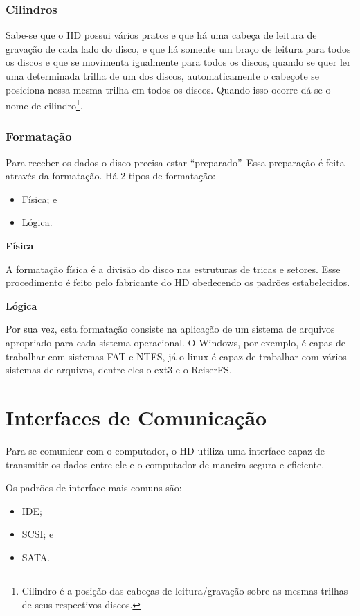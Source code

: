 \subsubsection{Cilindros}

Sabe-se que o HD possui vários pratos e que há uma cabeça de leitura de gravação de cada lado do disco, e que há somente um braço de leitura para todos os discos e que se movimenta igualmente para todos os discos, quando se quer ler uma determinada trilha de um dos discos, automaticamente o cabeçote se posiciona nessa mesma trilha em todos os discos. Quando isso ocorre dá-se o nome de cilindro\footnote{Cilindro é a posição das cabeças de leitura/gravação sobre as mesmas trilhas de seus respectivos discos.}.

\subsubsection{Formatação}

Para receber os dados o disco precisa estar ``preparado''. Essa preparação é feita através da formatação. Há 2 tipos de formatação:

\begin{itemize}
	\item Física; e
	\item Lógica.
\end{itemize}

\textbf{Física}

A formatação física é a divisão do disco nas estruturas de tricas e setores. Esse procedimento é feito pelo fabricante do HD obedecendo os padrões estabelecidos.

\textbf{Lógica}

Por sua vez, esta formatação consiste na aplicação de um sistema de arquivos apropriado para cada sistema operacional. O Windows, por exemplo, é capas de trabalhar com sistemas FAT e NTFS, já o linux é capaz de trabalhar com vários sistemas de arquivos, dentre eles o ext3 e o ReiserFS.

\section{Interfaces de Comunicação}

Para se comunicar com o computador, o HD utiliza uma interface capaz de transmitir os dados entre ele e o computador de maneira segura e eficiente.

Os padrões de interface mais comuns são:

\begin{itemize}
	\item IDE;
	\item SCSI; e
	\item SATA.
\end{itemize}

